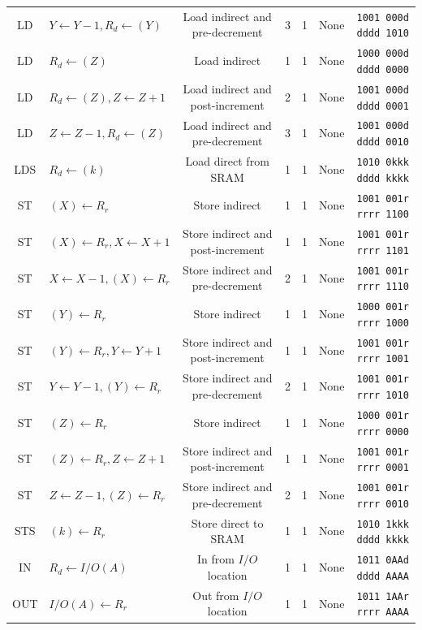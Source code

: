 \documentclass[11pt]{article}
\begin{document}
\begin{center}
\begin{longtable}{|c|m{12em}|c|c|c|c|c|}
LD & $Y \leftarrow Y - 1, R_d \leftarrow (Y)$ & Load indirect and pre-decrement & 3 & 1 & None & \texttt{1001 000d dddd 1010}\\
LD & $R_d \leftarrow (Z)$ & Load indirect & 1 & 1 & None & \texttt{1000 000d dddd 0000}\\
LD & $R_d \leftarrow (Z), Z \leftarrow Z + 1$ & Load indirect and post-increment & 2 & 1 & None & \texttt{1001 000d dddd 0001}\\
LD & $Z \leftarrow Z - 1, R_d \leftarrow (Z)$ & Load indirect and pre-decrement & 3 & 1 & None & \texttt{1001 000d dddd 0010}\\
LDS & $R_d \leftarrow (k)$ & Load direct from SRAM & 1 & 1 & None & \texttt{1010 0kkk dddd kkkk}\\
ST & $(X) \leftarrow R_r$ & Store indirect & 1 & 1 & None & \texttt{1001 001r rrrr 1100}\\
ST & $(X) \leftarrow R_r, X \leftarrow X + 1$ & Store indirect and post-increment & 1 & 1 & None & \texttt{1001 001r rrrr 1101}\\
ST & $X \leftarrow X - 1, (X) \leftarrow R_r$ & Store indirect and pre-decrement & 2 & 1 & None & \texttt{1001 001r rrrr 1110}\\
ST & $(Y) \leftarrow R_r$ & Store indirect & 1 & 1 & None & \texttt{1000 001r rrrr 1000}\\
ST & $(Y) \leftarrow R_r, Y \leftarrow Y + 1$ & Store indirect and post-increment & 1 & 1 & None & \texttt{1001 001r rrrr 1001}\\
ST & $Y \leftarrow Y - 1, (Y) \leftarrow R_r$ & Store indirect and pre-decrement & 2 & 1 & None & \texttt{1001 001r rrrr 1010}\\
ST & $(Z) \leftarrow R_r$ & Store indirect & 1 & 1 & None & \texttt{1000 001r rrrr 0000}\\
ST & $(Z) \leftarrow R_r, Z \leftarrow Z + 1$ & Store indirect and post-increment & 1 & 1 & None & \texttt{1001 001r rrrr 0001}\\
ST & $Z \leftarrow Z - 1, (Z) \leftarrow R_r$ & Store indirect and pre-decrement & 2 & 1 & None & \texttt{1001 001r rrrr 0010}\\
STS & $(k) \leftarrow R_r$ & Store direct to SRAM & 1 & 1 & None & \texttt{1010 1kkk dddd kkkk}\\
IN & $R_d \leftarrow I/O(A)$ & In from $I/O$ location & 1 & 1 & None & \texttt{1011 0AAd dddd AAAA}\\
OUT & $I/O(A) \leftarrow R_r$ & Out from $I/O$ location & 1 & 1 & None & \texttt{1011 1AAr rrrr AAAA}\\

\end{longtable}
\end{center}
\end{document}
